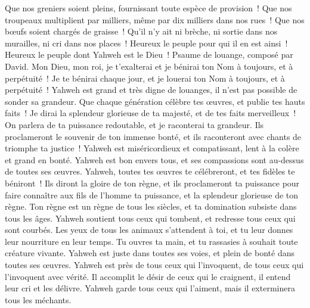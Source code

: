 \begin{multicols}{2}
Que nos greniers soient pleins, fournissant toute espèce de provision~! Que nos troupeaux multiplient par milliers, même par dix milliers dans nos rues~!
Que nos bœufs soient chargés de graisse~! Qu'il n'y ait ni brèche, ni sortie dans nos murailles, ni cri dans nos places~!
Heureux le peuple pour qui il en est ainsi~! Heureux le peuple dont Yahweh est le Dieu~!
\VerseOne{}Psaume de louange, composé par David.  Mon Dieu, mon roi, je t'exalterai et je bénirai ton Nom à toujours, et à perpétuité~!
 Je te bénirai chaque jour, et je louerai ton Nom à toujours, et à perpétuité~!
 Yahweh est grand et très digne de louanges, il n'est pas possible de sonder sa grandeur.
 Que chaque génération célèbre tes œuvres, et publie tes hauts faits~!
 Je dirai la splendeur glorieuse de ta majesté, et de tes faits merveilleux~!
 On parlera de ta puissance redoutable, et je raconterai ta grandeur.
 Ils proclameront le souvenir de ton immense bonté, et ils raconteront avec chants de triomphe ta justice~!
 Yahweh est miséricordieux et compatissant, lent à la colère et grand en bonté.
 Yahweh est bon envers tous, et ses compassions sont au-dessus de toutes ses œuvres.
 Yahweh, toutes tes œuvres te célébreront, et tes fidèles te béniront~!
 Ils diront la gloire de ton règne, et ils proclameront ta puissance
 pour faire connaître aux fils de l'homme ta puissance, et la splendeur glorieuse de ton règne.
 Ton règne est un règne de tous les siècles, et ta domination subsiste dans tous les âges.
 Yahweh soutient tous ceux qui tombent, et redresse tous ceux qui sont courbés.
 Les yeux de tous les animaux s'attendent à toi, et tu leur donnes leur nourriture en leur temps.
 Tu ouvres ta main, et tu rassasies à souhait toute créature vivante.
 Yahweh est juste dans toutes ses voies, et plein de bonté dans toutes ses œuvres.
 Yahweh est près de tous ceux qui l'invoquent, de tous ceux qui l'invoquent avec vérité.
 Il accomplit le désir de ceux qui le craignent, il entend leur cri et les délivre.
 Yahweh garde tous ceux qui l'aiment, mais il exterminera tous les méchants.

\end{multicols}
